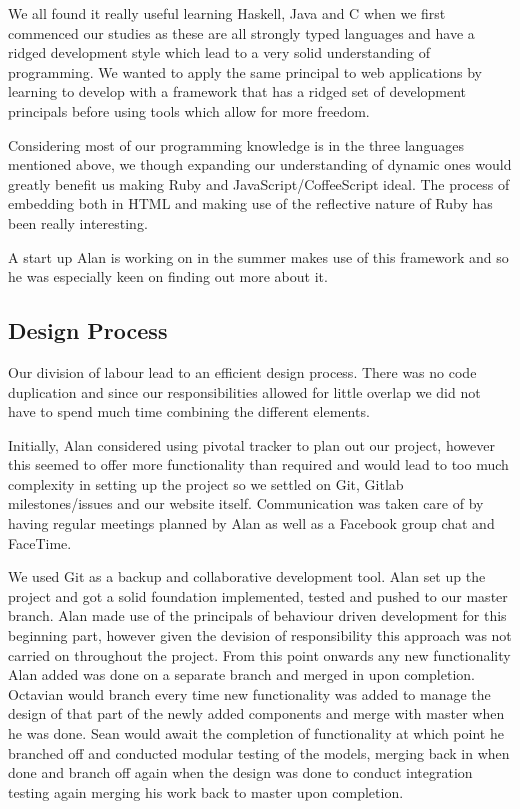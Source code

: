 \documentclass[a4wide, 11pt]{article}
\begin{document}
We all found it really useful learning Haskell, Java and C when we first commenced our studies as these are all strongly typed languages and have a ridged development style which lead to a very solid understanding of programming. We wanted to apply the same principal to web applications by learning to develop with a framework that has a ridged set of development principals before using tools which allow for more freedom. 

Considering most of our programming knowledge is in the three languages mentioned above, we though expanding our understanding of dynamic ones would greatly benefit us making Ruby and JavaScript/CoffeeScript ideal. The process of embedding both in HTML and making use of the reflective nature of Ruby has been really interesting.

A start up Alan is working on in the summer makes use of this framework and so he was especially keen on finding out more about it. 

\subsection{Design Process}
Our division of labour lead to an efficient design process. There was no code duplication and since our responsibilities allowed for little overlap we did not have to spend much time combining the different elements. 

Initially, Alan considered using pivotal tracker to plan out our project, however this seemed to offer more functionality than required and would lead to too much complexity in setting up the project so we settled on Git, Gitlab milestones/issues and our website itself. Communication was taken care of by having regular meetings planned by Alan as well as a Facebook group chat and FaceTime. 

We used Git as a backup and collaborative development tool. Alan set up the project and got a solid foundation implemented, tested and pushed to our master branch. Alan made use of the principals of behaviour driven development for this beginning part, however given the devision of responsibility this approach was not carried on throughout the project.
From this point onwards any new functionality Alan added was done on a separate branch and merged in upon completion. 
Octavian would branch every time new functionality was added to manage the design of that part of the newly added components and merge with master when he was done. 
Sean would await the completion of functionality at which point he branched off and conducted modular testing of the models, merging back in when done and branch off again when the design was done to conduct integration testing again merging his work back to master upon completion. 
\end{document}

